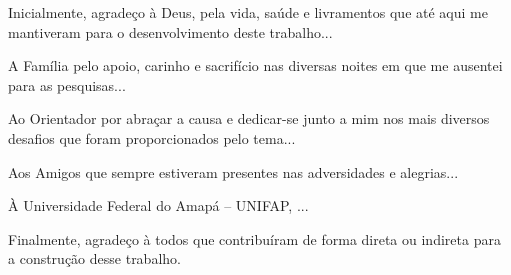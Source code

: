 %
%

\begin{agradecimentos}

Inicialmente, agradeço à Deus, pela vida, saúde e livramentos que até aqui me mantiveram para o desenvolvimento deste trabalho...

A Família pelo apoio, carinho e sacrifício nas diversas noites em que me ausentei para as pesquisas...

Ao Orientador por abraçar a causa e dedicar-se junto a mim nos mais diversos desafios que foram proporcionados pelo tema...

Aos Amigos que sempre estiveram presentes nas adversidades e alegrias...

À Universidade Federal do Amapá -- UNIFAP, ...

Finalmente, agradeço à todos que contribuíram de forma direta ou indireta para a construção desse trabalho. 

\end{agradecimentos}

